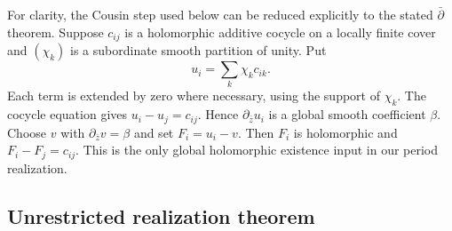 \documentclass[11pt,a4paper]{article}
\numberwithin{equation}{section}
\theoremstyle{definition}
\theoremstyle{remark}
\newcommand{\dbar}{\partial_{\bar z}}
\begin{document}
For clarity, the Cousin step used below can be reduced explicitly to the
stated $\bar\partial$ theorem. Suppose $c_{ij}$ is a holomorphic additive
cocycle on a locally finite cover and $(\chi_k)$ is a subordinate smooth
partition of unity. Put
\begin{equation}\label{eq:Cousin-partition}
 u_i=\sum_k\chi_k c_{ik}.
\end{equation}
Each term is extended by zero where necessary, using the support of $\chi_k$.
The cocycle equation gives $u_i-u_j=c_{ij}$. Hence $\dbar u_i$ is a global
smooth coefficient $\beta$. Choose $v$ with $\dbar v=\beta$ and set
$F_i=u_i-v$. Then $F_i$ is holomorphic and $F_i-F_j=c_{ij}$.
This is the only global holomorphic existence input in our period realization.

\subsection{Unrestricted realization theorem}
\end{document}
